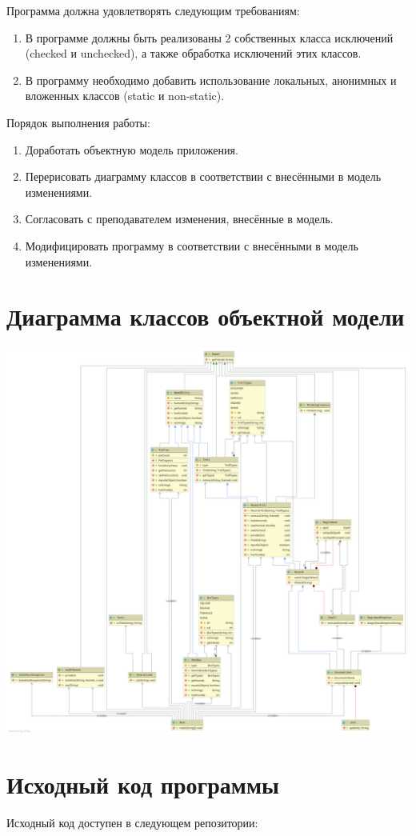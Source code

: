 \documentclass[11pt,a4paper]{article}
\begin{document}
	Программа должна удовлетворять следующим требованиям:
	\begin{enumerate}
		\item В программе должны быть реализованы 2 собственных класса исключений (checked и unchecked), а также обработка исключений этих классов.
		\item В программу необходимо добавить использование локальных, анонимных и вложенных классов (static и non-static).
	\end{enumerate}

	Порядок выполнения работы:
	\begin{enumerate}
		\item Доработать объектную модель приложения.
		\item Перерисовать диаграмму классов в соответствии с внесёнными в модель изменениями.
		\item Согласовать с преподавателем изменения, внесённые в модель.
		\item Модифицировать программу в соответствии с внесёнными в модель изменениями.
	\end{enumerate}
  \section{Диаграмма классов объектной модели}
	  \includegraphics[width=\linewidth]{../dia.png}
  \section{Исходный код программы}
    Исходный код доступен в следующем репозитории:
    
\end{document}
